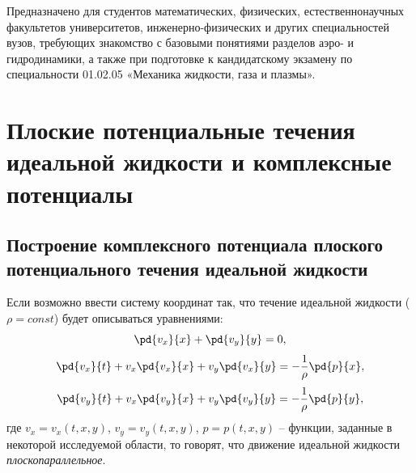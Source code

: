 \documentclass[a4paper, 14pt]{extarticle}
\begin{document}
Предназначено для студентов математических, физических, естественнонаучных факультетов университетов, инженерно-физических и других специальностей вузов, требующих знакомство с базовыми понятиями разделов аэро- и гидродинамики, а также при подготовке к кандидатскому экзамену по специальности 01.02.05 «Механика жидкости, газа и плазмы».	

%
%
%	
%	


\newpage\normalfont\normalsize
\tableofcontents
	
	
\section{Плоские потенциальные течения идеальной жидкости и комплексные потенциалы}



\subsection{Построение комплексного потенциала плоского потенциального течения идеальной жидкости }

Если возможно ввести систему координат так, что течение идеальной жидкости ($\rho=const$) будет описываться уравнениями:	
\begin{equation}
	\label{eq:ideal_liquid_planar_mass}
	\pd{v_x}{x}+\pd{v_y}{y} = 0,
\end{equation}
\begin{equation}
	\label{eq:ideal_liquid_planar_momentum_x}
	\pd{v_x}{t}+v_x \pd{v_x}{x} + v_y \pd{v_x}{y} = -\frac{1}{\rho} \pd{p}{x},
\end{equation}	
\begin{equation}
	\label{eq:ideal_liquid_planar_momentum_y}
	\pd{v_y}{t}+v_x \pd{v_y}{x} + v_y \pd{v_y}{y} = -\frac{1}{\rho} \pd{p}{y},	
\end{equation}
где $v_x = v_x(t,x,y)$, $v_y = v_y(t,x,y)$, $p=p(t,x,y)$ -- функции, заданные в некоторой исследуемой области, то говорят, что движение идеальной жидкости \textit{плоскопараллельное}.
\end{document}
